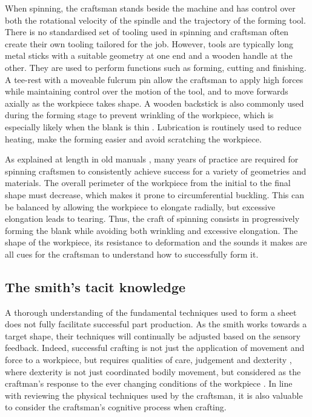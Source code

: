 When spinning, the craftsman stands beside the machine and has control over both the rotational velocity of the spindle and the trajectory of the forming tool. There is no standardised set of tooling used in spinning and craftsman often create their own tooling tailored for the job. However, tools are typically long metal sticks with a suitable geometry at one end and a wooden handle at the other. They are used to perform functions such as forming, cutting and finishing. A tee-rest with a moveable fulcrum pin allow the craftsman to apply high forces while maintaining control over the motion of the tool, and to move forwards axially as the workpiece takes shape. A wooden backstick is also commonly used during the forming stage to prevent wrinkling of the workpiece, which is especially likely when the blank is thin \citep{Jawale2019AnSpinning}. Lubrication is routinely used to reduce heating, make the forming easier and avoid scratching the workpiece. 

As explained at length in old manuals \citep{Holtzappfel1852TurningManipulation,Tuells1912MetalUsed}, many years of practice are required for spinning craftsmen to consistently achieve success for a variety of geometries and materials. The overall perimeter of the workpiece from the initial to the final shape must decrease, which makes it prone to circumferential buckling. This can be balanced by allowing the workpiece to elongate radially, but excessive elongation leads to tearing. Thus, the craft of spinning consists in progressively forming the blank while avoiding both wrinkling and excessive elongation. The shape of the workpiece, its resistance to deformation and the sounds it makes are all cues for the craftsman to understand how to successfully form it. 

\subsection{The smith's tacit knowledge} \label{sec:tacitknowledge}

A thorough understanding of the fundamental techniques used to form a sheet does not fully facilitate successful part production. As the smith works towards a target shape, their techniques will continually be adjusted based on the sensory feedback. Indeed, successful crafting is not just the application of movement and force to a workpiece, but requires qualities of care, judgement and dexterity \citep{Pye2008TheWorkmanship}, where dexterity is not just coordinated bodily movement, but considered as the craftman's response to the ever changing conditions of the workpiece \citep{Ingold2001BeyondSkill}. In line with reviewing the physical techniques used by the craftsman, it is also valuable to consider the craftsman's cognitive process when crafting.

